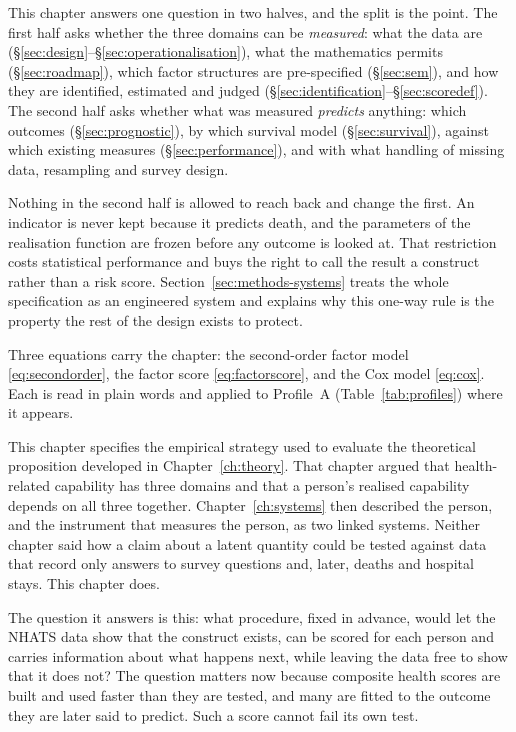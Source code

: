 \label{ch:methods}

\begin{ataglance}
This chapter answers one question in two halves, and the split is the point.
The first half asks whether the three domains can be \emph{measured}: what the
data are (\S\ref{sec:design}--\S\ref{sec:operationalisation}), what the
mathematics permits (\S\ref{sec:roadmap}), which factor structures are
pre-specified (\S\ref{sec:sem}), and how they are identified, estimated and
judged (\S\ref{sec:identification}--\S\ref{sec:scoredef}). The second half asks
whether what was measured \emph{predicts} anything: which outcomes
(\S\ref{sec:prognostic}), by which survival model (\S\ref{sec:survival}),
against which existing measures (\S\ref{sec:performance}), and with what
handling of missing data, resampling and survey design.

Nothing in the second half is allowed to reach back and change the first. An
indicator is never kept because it predicts death, and the parameters of the
realisation function are frozen before any outcome is looked at. That
restriction costs statistical performance and buys the right to call the result
a construct rather than a risk score. Section~\ref{sec:methods-systems} treats
the whole specification as an engineered system and explains why this one-way
rule is the property the rest of the design exists to protect.

Three equations carry the chapter: the second-order factor model
\eqref{eq:secondorder}, the factor score \eqref{eq:factorscore}, and the Cox
model \eqref{eq:cox}. Each is read in plain words and applied to Profile~A
(Table~\ref{tab:profiles}) where it appears.
\end{ataglance}

\noindent This chapter specifies the empirical strategy used to evaluate the theoretical proposition developed in Chapter~\ref{ch:theory}. That chapter argued that health-related capability has three domains and that a person's realised capability depends on all three together. Chapter~\ref{ch:systems} then described the person, and the instrument that measures the person, as two linked systems. Neither chapter said how a claim about a latent quantity could be tested against data that record only answers to survey questions and, later, deaths and hospital stays. This chapter does.

The question it answers is this: what procedure, fixed in advance, would let the NHATS data show that the construct exists, can be scored for each person and carries information about what happens next, while leaving the data free to show that it does not? The question matters now because composite health scores are built and used faster than they are tested, and many are fitted to the outcome they are later said to predict. Such a score cannot fail its own test.

